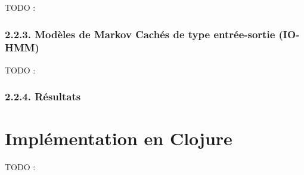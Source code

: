 \documentclass[letterpaper]{article}
\begin{document}
TODO : \citep{JP} \citep{DR}

\subsubsection*{2.2.3. Modèles de Markov Cachés de type entrée-sortie (IO-HMM)}

TODO : \citep{YB}

\subsubsection*{2.2.4. Résultats}

\begin{table}[h]
\vskip 0.25cm
\caption{Évaluation des méthodes présentées selon différents indices :
ACC (accuracy), REL (relative keys), PAR (parallel keys) et OBF (out-by-a-fifth keys).
Le tableau reprend les scores du modèle cognitif (COGN), du modèle d\textquotesingle autocorrélation,
des modèles de Markov cachés (HMM), et du modèle de Markov caché d\textquotesingle entrée-sortie (IO-HMM).}
\end{table}

\section{Implémentation en Clojure}

TODO : \citep{SK}


\footnotesize


\end{document}
